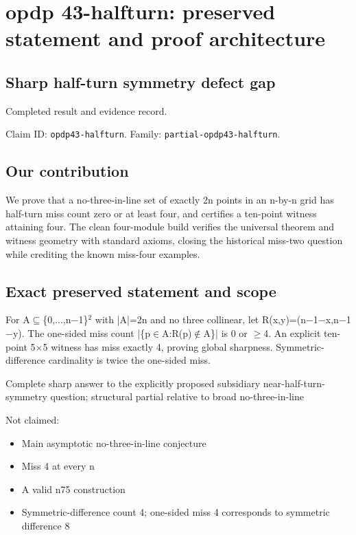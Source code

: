 \documentclass[11pt,a4paper]{article}
\begin{document}
\section{opdp 43-halfturn: preserved statement and proof architecture}
\subsection{Sharp half-turn symmetry defect gap}
Completed result and evidence record.

Claim ID: \texttt{opdp43-halfturn}. Family: \texttt{partial-opdp43-halfturn}.

\subsection{Our contribution}
We prove that a no-three-in-line set of exactly 2n points in an n-by-n grid has half-turn miss count zero or at least four, and certifies a ten-point witness attaining four. The clean four-module build verifies the universal theorem and witness geometry with standard axioms, closing the historical miss-two question while crediting the known miss-four examples.

\subsection{Exact preserved statement and scope}
For A\ensuremath{\subseteq}\{0,...,n\ensuremath{-}1\}\ensuremath{^2} with |A|=2n and no three collinear, let R(x,y)=(n\ensuremath{-}1\ensuremath{-}x,n\ensuremath{-}1\ensuremath{-}y). The one-sided miss count |\{p\ensuremath{\in}A:R(p)\ensuremath{\notin}A\}| is 0 or \ensuremath{\geq}4. An explicit ten-point 5\ensuremath{\times}5 witness has miss exactly 4, proving global sharpness. Symmetric-difference cardinality is twice the one-sided miss.

Complete sharp answer to the explicitly proposed subsidiary near-half-turn-symmetry question; structural partial relative to broad no-three-in-line

Not claimed:

\begin{itemize}
\item Main asymptotic no-three-in-line conjecture
\end{itemize}
\begin{itemize}
\item Miss 4 at every n
\end{itemize}
\begin{itemize}
\item A valid n75 construction
\end{itemize}
\begin{itemize}
\item Symmetric-difference count 4; one-sided miss 4 corresponds to symmetric difference 8
\end{itemize}
\end{document}
